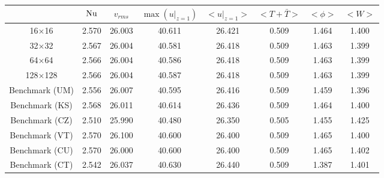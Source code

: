 \begin{tabular}{c|ccccccc}
    & $\mathrm{Nu}$ & $v_{rms}$ & $\max(u|_{z=1})$ & $<u|_{z=1}>$ & $<T + \bar{T}>$ & $<\phi>$ & $<W>$ \\
\hline
16$\times$16 & 2.570 & 26.003 & 40.611 & 26.421 & 0.509 & 1.464 & 1.400 \\
32$\times$32 & 2.567 & 26.004 & 40.581 & 26.418 & 0.509 & 1.463 & 1.399 \\
64$\times$64 & 2.566 & 26.004 & 40.586 & 26.418 & 0.509 & 1.463 & 1.399 \\
128$\times$128 & 2.566 & 26.004 & 40.587 & 26.418 & 0.509 & 1.463 & 1.399 \\
\hline
Benchmark (UM) & 2.556 & 26.007 & 40.595 & 26.416 & 0.509 & 1.459 & 1.396 \\
Benchmark (KS) & 2.568 & 26.011 & 40.614 & 26.436 & 0.509 & 1.464 & 1.400 \\
Benchmark (CZ) & 2.510 & 25.990 & 40.480 & 26.350 & 0.505 & 1.455 & 1.425 \\
Benchmark (VT) & 2.570 & 26.100 & 40.600 & 26.400 & 0.509 & 1.465 & 1.400 \\
Benchmark (CU) & 2.570 & 26.000 & 40.600 & 26.400 & 0.509 & 1.465 & 1.402 \\
Benchmark (CT) & 2.542 & 26.037 & 40.630 & 26.440 & 0.509 & 1.387 & 1.401 \\
\end{tabular}
